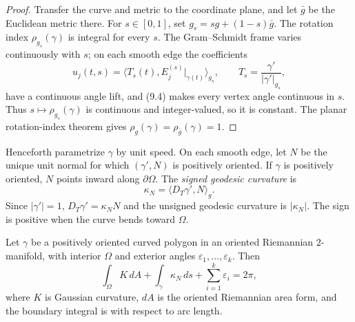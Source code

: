 \begin{proof}
\sketch
Transfer the curve and metric to the coordinate plane, and let $\bar g$ be the
Euclidean metric there.  For $s\in[0,1]$, set
$g_s=sg+(1-s)\bar g$.  The rotation index $\rho_{g_s}(\gamma)$ is integral for
every $s$.  The Gram--Schmidt frame varies continuously with $s$; on each
smooth edge the coefficients
\[
u_j(t,s)=\langle T_s(t),E_j^{(s)}|_{\gamma(t)}\rangle_{g_s},
\qquad
T_s=\frac{\gamma'}{|\gamma'|_{g_s}},
\]
have a continuous angle lift, and (9.4) makes every vertex angle continuous
in $s$.  Thus $s\mapsto\rho_{g_s}(\gamma)$ is continuous and integer-valued,
so it is constant.  The planar rotation-index theorem gives
$\rho_g(\gamma)=\rho_{\bar g}(\gamma)=1$.
\end{proof}

Henceforth parametrize $\gamma$ by unit speed.  On each smooth edge, let $N$
be the unique unit normal for which $(\gamma',N)$ is positively oriented.  If
$\gamma$ is positively oriented, $N$ points inward along $\partial\Omega$.
The \emph{signed geodesic curvature} is
\[
\kappa_N=\langle D_T\gamma',N\rangle_g.
\]
Since $|\gamma'|=1$,
$D_T\gamma'=\kappa_NN$ and the unsigned geodesic curvature is
$|\kappa_N|$.  The sign is positive when the curve bends toward $\Omega$.

\begin{theorem}
\label{thm:gauss-bonnet-formula}

Let $\gamma$ be a positively oriented curved polygon in an oriented
Riemannian $2$-manifold, with interior $\Omega$ and exterior angles
$\varepsilon_1,\ldots,\varepsilon_k$.  Then
\begin{equation}
\int_\Omega K\,dA+\int_\gamma\kappa_N\,ds
+\sum_{i=1}^k\varepsilon_i=2\pi, \tag{9.6}
\end{equation}
where $K$ is Gaussian curvature, $dA$ is the oriented Riemannian area form,
and the boundary integral is with respect to arc length.
\end{theorem}

